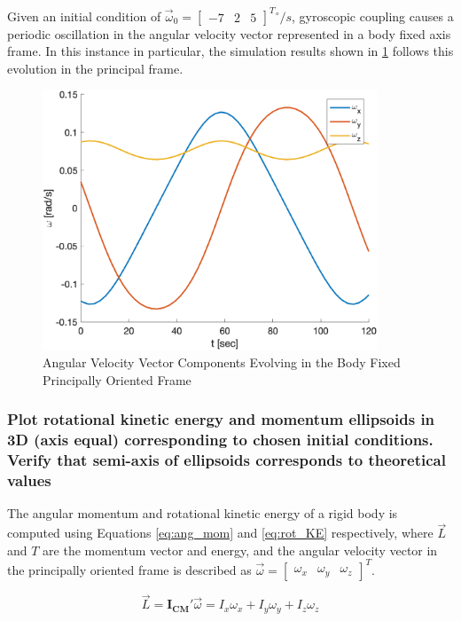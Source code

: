 Given an initial condition of $\vec{\omega}_0 = \begin{bmatrix}
    -7 & 2 & 5
\end{bmatrix}^T {}^{\circ}/s$, gyroscopic coupling causes a periodic oscillation in the angular velocity vector represented in a body fixed axis frame. In this instance in particular, the simulation results shown in \ref{fig:sim_omegas} follows this evolution in the principal frame.

\begin{figure}[H]
    \centering
    \includegraphics[width = 10cm] {Images/omega_prop_random.png}
    \caption{Angular Velocity Vector Components Evolving in the Body Fixed Principally Oriented Frame}
    \label{fig:sim_omegas}
\end{figure}

\subsubsection{Plot rotational kinetic energy and momentum ellipsoids in 3D (axis equal) corresponding to chosen initial conditions. Verify that semi-axis of ellipsoids corresponds to theoretical values} \label{sec:ellipsoid_definitions}

The angular momentum and rotational kinetic energy of a rigid body is computed using Equations \ref{eq:ang_mom} and \ref{eq:rot_KE} respectively, where $\vec{L}$ and $T$ are the momentum vector and energy, and the angular velocity vector in the principally oriented frame is described as $\vec{\omega} = \begin{bmatrix} \omega_x & \omega_y & \omega_z \end{bmatrix}^T$. 

\begin{equation} \label{eq:ang_mom}
    \vec{L} = \boldsymbol{I_{CM}'}\vec{\omega} = I_x \omega_x + I_y \omega_y + I_z \omega_z
\end{equation}

